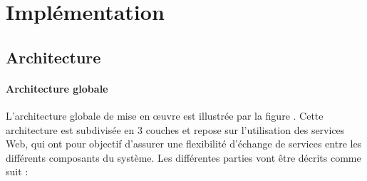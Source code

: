 \chapter{Implémentation}

\section{Architecture} %
\label{sec:architecture}
\subsubsection{Architecture globale} %
\label{ssub:architecture_globale}
L’architecture globale de mise en œuvre est illustrée par la figure . Cette architecture est subdivisée en 3 couches et repose sur l’utilisation des services Web, qui ont pour objectif d’assurer une flexibilité d’échange de services entre les différents composants du système.\newline
Les différentes parties vont être décrits comme suit :
